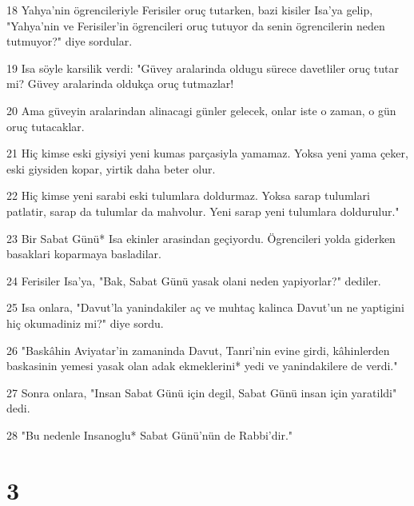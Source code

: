 \par 18 Yahya'nin ögrencileriyle Ferisiler oruç tutarken, bazi kisiler Isa'ya gelip, "Yahya'nin ve Ferisiler'in ögrencileri oruç tutuyor da senin ögrencilerin neden tutmuyor?" diye sordular.
\par 19 Isa söyle karsilik verdi: "Güvey aralarinda oldugu sürece davetliler oruç tutar mi? Güvey aralarinda oldukça oruç tutmazlar!
\par 20 Ama güveyin aralarindan alinacagi günler gelecek, onlar iste o zaman, o gün oruç tutacaklar.
\par 21 Hiç kimse eski giysiyi yeni kumas parçasiyla yamamaz. Yoksa yeni yama çeker, eski giysiden kopar, yirtik daha beter olur.
\par 22 Hiç kimse yeni sarabi eski tulumlara doldurmaz. Yoksa sarap tulumlari patlatir, sarap da tulumlar da mahvolur. Yeni sarap yeni tulumlara doldurulur."
\par 23 Bir Sabat Günü* Isa ekinler arasindan geçiyordu. Ögrencileri yolda giderken basaklari koparmaya basladilar.
\par 24 Ferisiler Isa'ya, "Bak, Sabat Günü yasak olani neden yapiyorlar?" dediler.
\par 25 Isa onlara, "Davut'la yanindakiler aç ve muhtaç kalinca Davut'un ne yaptigini hiç okumadiniz mi?" diye sordu.
\par 26 "Baskâhin Aviyatar'in zamaninda Davut, Tanri'nin evine girdi, kâhinlerden baskasinin yemesi yasak olan adak ekmeklerini* yedi ve yanindakilere de verdi."
\par 27 Sonra onlara, "Insan Sabat Günü için degil, Sabat Günü insan için yaratildi" dedi.
\par 28 "Bu nedenle Insanoglu* Sabat Günü'nün de Rabbi'dir."

\chapter{3}


